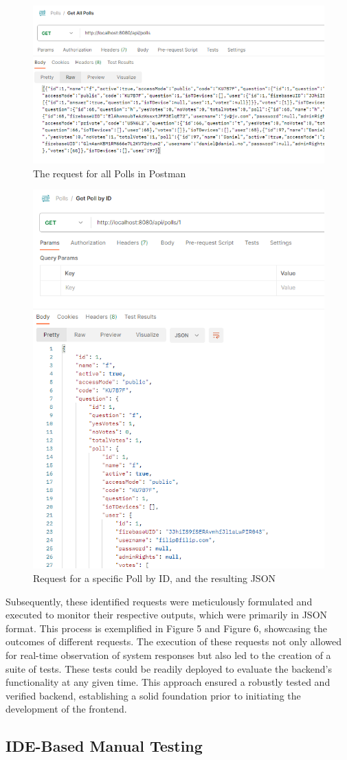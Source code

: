 \begin{figure}[!htbp]
    \centering
    \includegraphics[width=0.5\linewidth]{figs/PostmanGetAllPolls.png}
    \caption{The request for all Polls in Postman}
    \label{fig:PostAllPolls}
\end{figure}

\begin{figure}[!htbp]
    \centering
    \includegraphics[width=0.5\linewidth]{figs/PostmanGetPollById.png}
    \caption{Request for a specific Poll by ID, and the resulting JSON}
    \label{fig:PostPollById}
\end{figure}

Subsequently, these identified requests were meticulously formulated and executed to monitor their respective outputs, which were primarily in JSON format. This process is exemplified in Figure 5 and Figure 6, showcasing the outcomes of different requests. The execution of these requests not only allowed for real-time observation of system responses but also led to the creation of a suite of tests. These tests could be readily deployed to evaluate the backend's functionality at any given time. This approach ensured a robustly tested and verified backend, establishing a solid foundation prior to initiating the development of the frontend.

\subsection{IDE-Based Manual Testing}

